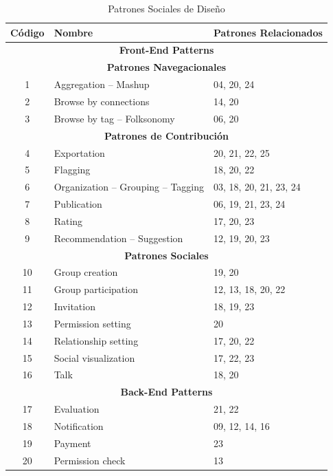 \documentclass[oneside,12pt,a4paper]{memoir}%
\begin{document}
\begin{enumerate}
	  	\begin{table}[htbp]
	  	\caption{Patrones Sociales de Dise\~no}
	  	\centering
			\begin{tabular}{|c|l|l|}
			\hline
				\textbf{C\'odigo} & \textbf{Nombre} & \textbf{Patrones Relacionados}  \\
				\hline \multicolumn{3}{|c|}{\textbf{Front-End Patterns}} \\\hline
				\multicolumn{3}{|c|}{\textbf{Patrones Navegacionales}} \\\hline
				1 & Aggregation -- Mashup & 04, 20, 24 \\ \hline
				2 & Browse by connections & 14, 20 \\ \hline
				3 & Browse by tag -- Folksonomy & 06, 20 \\ \hline
				\multicolumn{3}{|c|}{\textbf{Patrones de Contribuci\'on}} \\ \hline
				4 & Exportation & 20, 21, 22, 25 \\ \hline
				5 & Flagging & 18, 20, 22 \\ \hline
				6 & Organization -- Grouping -- Tagging & 03, 18, 20, 21, 23, 24 \\ \hline
				7 & Publication & 06, 19, 21, 23, 24 \\ \hline
				8 & Rating & 17, 20, 23 \\ \hline
				9 & Recommendation -- Suggestion & 12, 19, 20, 23 \\ \hline
				\multicolumn{3}{|c|}{\textbf{Patrones Sociales}} \\ \hline
				10 & Group creation & 19, 20 \\ \hline
				11 & Group participation & 12, 13, 18, 20, 22 \\ \hline
				12 & Invitation & 18, 19, 23 \\ \hline
				13 & Permission setting & 20 \\ \hline
				14 & Relationship setting & 17, 20, 22 \\ \hline
				15 & Social visualization & 17, 22, 23 \\ \hline
				16 & Talk & 18, 20 \\ \hline
				\multicolumn{3}{|c|}{\textbf{Back-End Patterns}} \\ \hline
				17 & Evaluation & 21, 22 \\ \hline
				18 & Notification & 09, 12, 14, 16 \\ \hline
				19 & Payment & 23 \\ \hline
				20 & Permission check & 13 \\ \hline

\end{tabular}
\end{table}
\end{enumerate}
\end{document}
